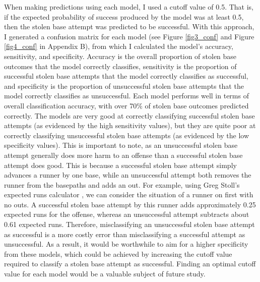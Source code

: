 \documentclass{article}
\begin{document}
When making predictions using each model, I used a cutoff value of 0.5. That is, if the expected probability of success produced by the model was at least 0.5, then the stolen base attempt was predicted to be successful. With this approach, I generated a confusion matrix for each model (see Figure \ref{fig3_conf} and Figure \ref{fig4_conf} in Appendix B), from which I calculated the model's accuracy, sensitivity, and specificity. Accuracy is the overall proportion of stolen base outcomes that the model correctly classifies, sensitivity is the proportion of successful stolen base attempts that the model correctly classifies as successful, and specificity is the proportion of unsuccessful stolen base attempts that the model correctly classifies as unsuccessful. Each model performs well in terms of overall classification accuracy, with over 70\% of stolen base outcomes predicted correctly. The models are very good at correctly classifying successful stolen base attempts (as evidenced by the high sensitivity values), but they are quite poor at correctly classifying unsuccessful stolen base attempts (as evidenced by the low specificity values). This is important to note, as an unsuccessful stolen base attempt generally does more harm to an offense than a successful stolen base attempt does good. This is because a successful stolen base attempt simply advances a runner by one base, while an unsuccessful attempt both removes the runner from the basepaths and adds an out. For example, using Greg Stoll’s expected runs calculator \citep{stoll}, we can consider the situation of a runner on first with no outs. A successful stolen base attempt by this runner adds approximately 0.25 expected runs for the offense, whereas an unsuccessful attempt subtracts about 0.61 expected runs. Therefore, misclassifying an unsuccessful stolen base attempt as successful is a more costly error than misclassifying a successful attempt as unsuccessful. As a result, it would be worthwhile to aim for a higher specificity from these models, which could be achieved by increasing the cutoff value required to classify a stolen base attempt as successful. Finding an optimal cutoff value for each model would be a valuable subject of future study.
\end{document}
